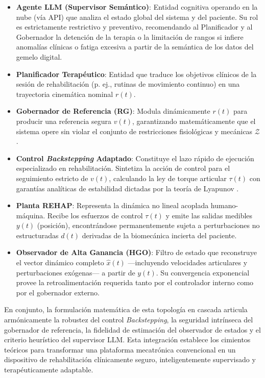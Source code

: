 \documentclass[a4paper,12pt]{article}
\begin{document}
\begin{itemize}
    \item \textbf{Agente LLM (Supervisor Semántico)}: Entidad cognitiva operando en la nube (vía API) que analiza el estado global del sistema y del paciente. Su rol es estrictamente restrictivo y preventivo, recomendando al Planificador y al Gobernador la detención de la terapia o la limitación de rangos si infiere anomalías clínicas o fatiga excesiva a partir de la semántica de los datos del gemelo digital.
    \item \textbf{Planificador Terapéutico}: Entidad que traduce los objetivos clínicos de la sesión de rehabilitación (p. ej., rutinas de movimiento continuo) en una trayectoria cinemática nominal $r(t)$.
    \item \textbf{Gobernador de Referencia (RG)}: Modula dinámicamente $r(t)$ para producir una referencia segura $v(t)$, garantizando matemáticamente que el sistema opere sin violar el conjunto de restricciones fisiológicas y mecánicas $\mathcal{Z}$ \citep{garone2017reference}.
    \item \textbf{Control \textit{Backstepping} Adaptado}: Constituye el lazo rápido de ejecución especializado en rehabilitación. Sintetiza la acción de control para el seguimiento estricto de $v(t)$, calculando la ley de torque articular $\tau(t)$ con garantías analíticas de estabilidad dictadas por la teoría de Lyapunov \citep{slotine1991applied}.
    \item \textbf{Planta REHAP}: Representa la dinámica no lineal acoplada humano-máquina. Recibe los esfuerzos de control $\tau(t)$ y emite las salidas medibles $y(t)$ (posición), encontrándose permanentemente sujeta a perturbaciones no estructuradas $d(t)$ derivadas de la biomecánica incierta del paciente.
    \item \textbf{Observador de Alta Ganancia (HGO)}: Filtro de estado que reconstruye el vector dinámico completo $\hat{x}(t)$ —incluyendo velocidades articulares y perturbaciones exógenas— a partir de $y(t)$. Su convergencia exponencial provee la retroalimentación requerida tanto por el controlador interno como por el gobernador externo.
\end{itemize}

En conjunto, la formulación matemática de esta topología en cascada articula armónicamente la robustez del control \textit{Backstepping}, la seguridad intrínseca del gobernador de referencia, la fidelidad de estimación del observador de estados y el criterio heurístico del supervisor LLM. Esta integración establece los cimientos teóricos para transformar una plataforma mecatrónica convencional en un dispositivo de rehabilitación clínicamente seguro, inteligentemente supervisado y terapéuticamente adaptable.
\end{document}

